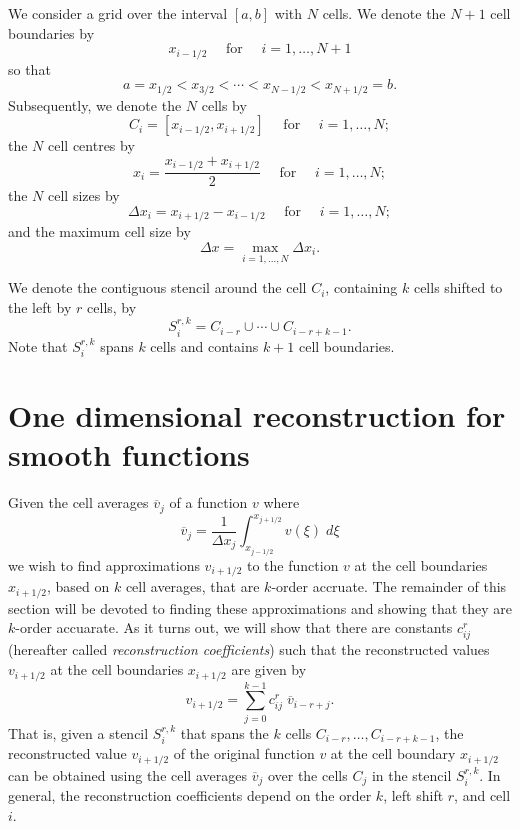 \documentclass{article}
\newcommand{\for}[0]{\quad \text{ for } \quad}
\newcommand{\xli}[0]{x_{i-1/2}}
\newcommand{\xri}[0]{x_{i+1/2}}
\newcommand{\xlj}[0]{x_{j-1/2}}
\newcommand{\xrj}[0]{x_{j+1/2}}
\newcommand{\vri}[0]{v_{i+1/2}}
\numberwithin{equation}{section}
\begin{document}
We consider a grid over the interval $[a,b]$ with $N$ cells.  We
denote the $N+1$ cell boundaries by
\begin{equation}
  x_{i-1/2} \for i = 1,\ldots,N+1
\end{equation}
so that
\begin{equation}
  a = x_{1/2} < x_{3/2} < \cdots < x_{N-1/2} < x_{N+1/2} = b.
\end{equation}
Subsequently, we denote the $N$ cells by
\begin{equation}
  C_i = [\xli, \xri] \for i=1,\ldots,N;
\end{equation}
the $N$ cell centres by
\begin{equation}
  x_i = \frac{\xli + \xri}{2} \for i=1,\ldots,N;
\end{equation}
the $N$ cell sizes by
\begin{equation}
  \Delta x_i = \xri - \xli \for i=1,\ldots,N;
\end{equation}
and the maximum cell size by
\begin{equation}
  \Delta x = \max_{i=1,\ldots,N} \Delta x_i.
\end{equation}

We denote the contiguous stencil around the cell $C_i$, containing $k$
cells shifted to the left by $r$ cells, by
\begin{equation}
  S_i^{r,k} = C_{i-r} \cup \cdots \cup C_{i-r+k-1}.
\end{equation}
Note that $S_i^{r,k}$ spans $k$ cells and contains $k+1$ cell
boundaries.

\newpage
\section{One dimensional reconstruction for smooth functions}
\label{sec:reconstruction}

Given the cell averages $\overline{v}_j$ of a function $v$ where
\begin{equation}
  \overline{v}_j = \frac{1}{\Delta x_j} \int_{\xlj}^{\xrj} v(\xi) \;d\xi
\end{equation}
we wish to find approximations $\vri$ to the function $v$ at the cell
boundaries $\xri$, based on $k$ cell averages, that are $k$-order
accruate.  The remainder of this section will be devoted to finding
these approximations and showing that they are $k$-order accuarate.
As it turns out, we will show that there are constants $c^r_{ij}$
(hereafter called \emph{reconstruction coefficients}) such that the
reconstructed values $\vri$ at the cell boundaries $\xri$ are given by
\begin{equation*}
  \vri = \sum_{j=0}^{k-1} c^r_{ij}\; \overline{v}_{i-r+j}.
\end{equation*}
That is, given a stencil $S_i^{r,k}$ that spans the $k$ cells
$C_{i-r},\ldots,C_{i-r+k-1}$, the reconstructed value $\vri$ of the
original function $v$ at the cell boundary $\xri$ can be obtained
using the cell averages $\overline{v}_{j}$ over the cells $C_j$ in the
stencil $S_i^{r,k}$.  In general, the reconstruction coefficients
depend on the order $k$, left shift $r$, and cell $i$.
\end{document}
